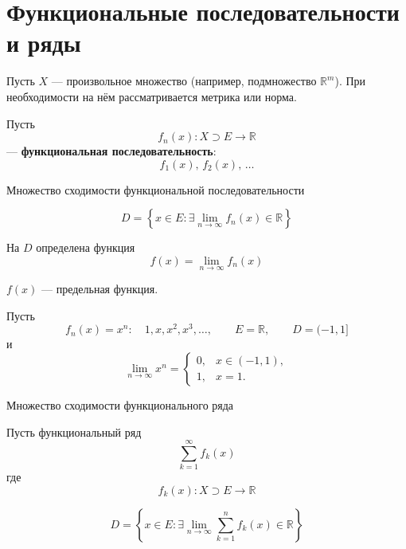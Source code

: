 \documentclass[12pt,a4paper]{article}
\begin{document}
\newpage

\section{Функциональные последовательности и ряды}

Пусть $X$ --- произвольное множество (например, подмножество $\mathbb R^m$). При необходимости на нём рассматривается метрика или норма.

Пусть
\[
    f_n(x)\colon X\supset E\to\mathbb{R}
\]
--- \textbf{функциональная последовательность}:
\[
    f_1(x),\,f_2(x),\,\ldots
\]

\begin{definition}{Множество сходимости функциональной последовательности}

    \[
        D=\left\{x\in E:\exists\lim_{n\to\infty}f_n(x)\in\mathbb{R}\right\}
    \]

    На $D$ определена функция
    \[
        f(x)=\lim_{n\to\infty}f_n(x)
    \]

    $f(x)$ --- предельная функция.

\end{definition}

\begin{example}

    Пусть
    \[
        f_n(x)=x^n:\quad 1,x,x^2,x^3,\ldots,
        \qquad E=\mathbb{R},\qquad D=(-1,1]
    \]
    и
    \[
        \lim_{n\to\infty}x^n=
        \begin{cases}
            0, & x\in(-1,1),\\
            1, & x=1.
        \end{cases}
    \]

\end{example}

\begin{definition}{Множество сходимости функционального ряда}

    Пусть функциональный ряд
    \[
        \sum_{k=1}^{\infty}f_k(x)
    \]
    где
    \[
        f_k(x)\colon X\supset E\to\mathbb{R}
    \]

    \[
        D=
        \left\{
        x\in E:
        \exists\lim_{n\to\infty}\sum_{k=1}^{n}f_k(x)\in\mathbb{R}
        \right\}
    \]

\end{definition}
\end{document}

